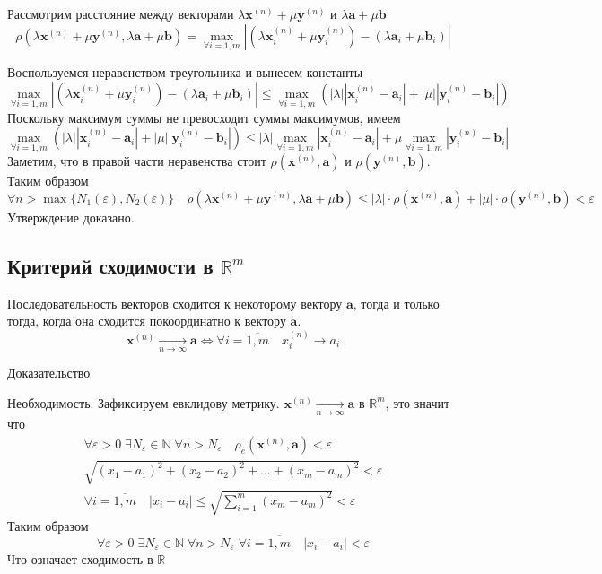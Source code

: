 \begin{enumerate}
  Рассмотрим расстояние между векторами $ \lambda \textbf {x}^{(n)} + \mu \textbf {y}^{(n)}$ и $\lambda \textbf {a} + \mu \textbf {b}$
  $$
  \rho(\lambda \textbf {x}^{(n)} + \mu \textbf {y}^{(n)}, \lambda \textbf {a} + \mu \textbf {b}) = \underset{\forall i=1, m}{\max}{|(\lambda \textbf {x}^{(n)}_i + \mu \textbf {y}^{(n)}_i) - (\lambda \textbf {a}_i + \mu \textbf {b}_i)|}
  $$
  
  Воспользуемся неравенством треугольника и вынесем константы
  $$
  \underset{\forall i=1, m}{\max}{|(\lambda \textbf {x}^{(n)}_i + \mu \textbf {y}^{(n)}_i) - (\lambda \textbf {a}_i + \mu \textbf {b}_i)|} \leq \underset{\forall i=1, m}{\max}{(|\lambda| |\textbf {x}^{(n)}_i - \textbf {a}_i| + |\mu| |\textbf {y}^{(n)}_i - \textbf {b}_i|)}
  $$
  Поскольку максимум суммы не превосходит суммы максимумов, имеем
  $$
  \underset{\forall i=1, m}{\max}{(|\lambda| |\textbf {x}^{(n)}_i - \textbf {a}_i| + |\mu| |\textbf {y}^{(n)}_i - \textbf {b}_i|)} \leq |\lambda| \underset{\forall i=1, m}{\max}{|\textbf {x}^{(n)}_i - \textbf {a}_i|} + \mu \underset{\forall i=1, m}{\max}{|\textbf {y}^{(n)}_i - \textbf {b}_i|}
  $$
  Заметим, что в правой части неравенства стоит $\rho(\textbf {x}^{(n)}, \textbf {a})$ и $\rho(\textbf {y}^{(n)}, \textbf {b} )$. Таким образом
  $$
  \forall n > \max\{N_1(\varepsilon), N_2(\varepsilon)\} \quad \rho(\lambda \textbf {x}^{(n)} + \mu \textbf {y}^{(n)}, \lambda \textbf {a} + \mu \textbf {b}) \leq |\lambda| \cdot \rho(\textbf {x}^{(n)}, \textbf {a} ) + |\mu| \cdot \rho(\textbf {y}^{(n)}, \textbf {b} ) < \varepsilon
  $$
  Утверждение доказано.
  \subsection{Критерий сходимости в $\mathbb {R}^m$}
  
  Последовательность векторов сходится к некоторому вектору $\textbf {a}$, тогда и только тогда, когда она сходится покоординатно к вектору $\textbf {a}$.
  $$
  \textbf {x}^{(n)}  \underset{n \to \infty}{\longrightarrow} \textbf {a} \Leftrightarrow \forall i = \overline{1,m} \quad x^{(n)}_i \longrightarrow a_i
  $$
  
  Доказательство
 
  Необходимость. Зафиксируем евклидову метрику. $\textbf {x}^{(n)}  \underset{n \to \infty}{\longrightarrow} \textbf {a}$ в $\mathbb {R}^m$, это значит что
  \begin{equation*}
  \begin{gathered}
  \forall \varepsilon > 0 \; \exists N_{\varepsilon} \in \mathbb {N} \; \forall n > N_{\varepsilon} \quad \rho_e(\textbf {x}^{(n)}, \textbf {a}) < \varepsilon\\
  \sqrt{(x_1 - a_1)^2 + (x_2 - a_2)^2 + ... + (x_m - a_m)^2} < \varepsilon\\
  \forall i = \overline{1,m} \quad |x_i - a_i| \leq \sqrt{\sum\limits_{i=1}^m (x_m - a_m)^2} < \varepsilon
  \end{gathered}
  \end{equation*}
  Таким образом
  $$
  \forall \varepsilon > 0 \; \exists N_{\varepsilon} \in \mathbb {N} \; \forall n > N_{\varepsilon} \; \forall i = \overline{1,m} \quad |x_i - a_i| < \varepsilon
  $$
  Что означает сходимость в $\mathbb {R}$
  

\end{enumerate}
